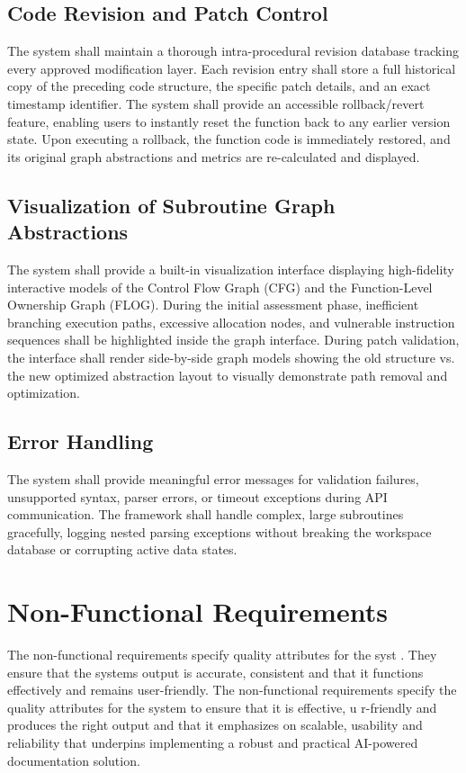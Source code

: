 \subsection{Code Revision and Patch Control}
\hspace{0.5cm}
The system shall maintain a thorough intra-procedural revision database tracking every approved modification layer. Each revision entry shall store a full historical copy of the preceding code structure, the specific patch details, and an exact timestamp identifier. The system shall provide an accessible rollback/revert feature, enabling users to instantly reset the function back to any earlier version state. Upon executing a rollback, the function code is immediately restored, and its original graph abstractions and metrics are re-calculated and displayed.

\subsection{Visualization of Subroutine Graph Abstractions}
The system shall provide a built-in visualization interface displaying high-fidelity interactive models of the Control Flow Graph (CFG) and the Function-Level Ownership Graph (FLOG). During the initial assessment phase, inefficient branching execution paths, excessive allocation nodes, and vulnerable instruction sequences shall be highlighted inside the graph interface. During patch validation, the interface shall render side-by-side graph models showing the old structure vs. the new optimized abstraction layout to visually demonstrate path removal and optimization.

\subsection{Error Handling}
The system shall provide meaningful error messages for validation failures, unsupported syntax, parser errors, or timeout exceptions during API communication. The framework shall handle complex, large subroutines gracefully, logging nested parsing exceptions without breaking the workspace database or corrupting active data states.

\section{Non-Functional Requirements}
\hspace{0.5cm}
The non-functional requirements specify quality attributes for the syst . They ensure that the systems output is accurate, consistent and that it functions effectively and remains user-friendly. The non-functional requirements specify the quality attributes for the system to ensure that it is effective, u r-friendly and produces the right output and that it emphasizes on scalable, usability and reliability that underpins implementing a robust and practical AI-powered documentation solution. 

